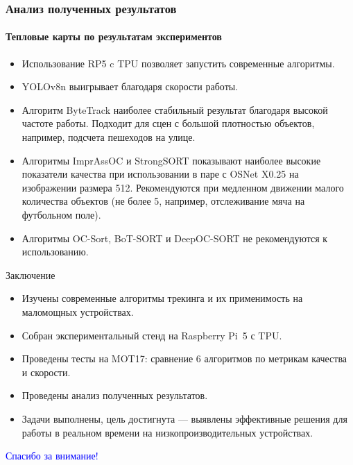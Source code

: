 \documentclass{beamer} %
\begin{document}
\begin{frame}
  \frametitle{Анализ полученных результатов}
  \framesubtitle{Тепловые карты по результатам экспериментов}
  \begin{itemize}
    \item Использование RP5 c TPU позволяет запустить современные алгоритмы.
    \item YOLOv8n выигрывает благодаря скорости работы.
    \item Алгоритм ByteTrack наиболее стабильный результат благодаря высокой частоте работы. Подходит для сцен с большой плотностью объектов, например, подсчета пешеходов на улице.
    \item Алгоритмы ImprAssOC и StrongSORT показывают наиболее высокие показатели качества при использовании в паре с OSNet X0.25 на изображении размера 512. Рекомендуются при медленном движении малого количества объектов (не более 5, например, отслеживание мяча на футбольном поле).
    \item Алгоритмы OC-Sort, BoT-SORT и DeepOC-SORT не рекомендуются к использованию.
  \end{itemize}
\end{frame}

\begin{frame}{Заключение}
  \begin{itemize}
    \item Изучены современные алгоритмы трекинга и их применимость на маломощных устройствах.
    \item Собран экспериментальный стенд на Raspberry Pi 5 с TPU.
    \item Проведены тесты на MOT17: сравнение 6 алгоритмов по метрикам качества и скорости.
    \item Проведены анализ полученных результатов.
    \item Задачи выполнены, цель достигнута — выявлены эффективные решения для работы в реальном времени на низкопроизводительных устройствах.
  \end{itemize}
\end{frame}


\begin{frame}
  \centering \Huge \textcolor{blue}{Спасибо за внимание!}
\end{frame}
\end{document}
